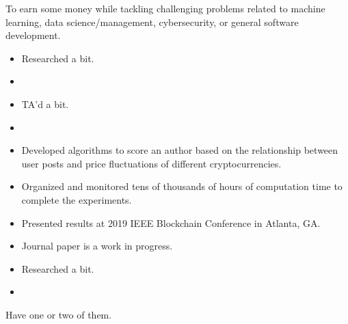 \documentclass[11pt]{resume}
\begin{document}

    \begin{fullwidth}
    \makeheader
    \end{fullwidth}
    
    \sffamily

    To earn some money while tackling challenging problems related to machine learning, data science/management, 
    cybersecurity, or general software development.

    
    
    \begin{itemize}
        \item Researched a bit.
        \item
    \end{itemize}

    \divider
        
    
    \begin{itemize}
        \item TA'd a bit.
        \item
    \end{itemize}
    

    
    \begin{itemize}
        \item Developed algorithms to score an author based on the relationship between user posts and price fluctuations of different cryptocurrencies.
        \item Organized and monitored tens of thousands of hours of computation time to complete the experiments.
        \item Presented results at 2019 IEEE Blockchain Conference in Atlanta, GA.
            \item Journal paper is a work in progress. 
    \end{itemize}

    \divider


    \begin{itemize}
        \item Researched a bit.
        \item
    \end{itemize}

    \divider
    Have one or two of them.
\end{document}
